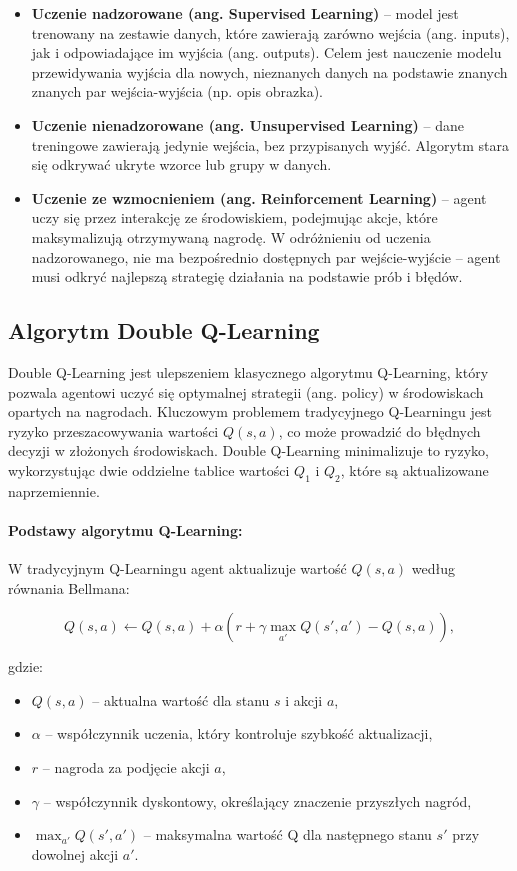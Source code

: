 \begin{itemize}
    \item \textbf{Uczenie nadzorowane (ang. Supervised Learning)} – model jest trenowany na zestawie danych, które zawierają zarówno wejścia (ang. inputs), jak i odpowiadające im wyjścia (ang. outputs). Celem jest nauczenie modelu przewidywania wyjścia dla nowych, nieznanych danych na podstawie znanych znanych par wejścia-wyjścia (np. opis obrazka).

    \item \textbf{Uczenie nienadzorowane (ang. Unsupervised Learning)} – dane treningowe zawierają jedynie wejścia, bez przypisanych wyjść. Algorytm stara się odkrywać ukryte wzorce lub grupy w danych.

    \item \textbf{Uczenie ze wzmocnieniem (ang. Reinforcement Learning)} – agent uczy się przez interakcję ze środowiskiem, podejmując akcje, które maksymalizują otrzymywaną nagrodę. W odróżnieniu od uczenia nadzorowanego, nie ma bezpośrednio dostępnych par wejście-wyjście – agent musi odkryć najlepszą strategię działania na podstawie prób i błędów.
\end{itemize}

\subsection{Algorytm Double Q-Learning}

Double Q-Learning jest ulepszeniem klasycznego algorytmu Q-Learning, który pozwala agentowi uczyć się optymalnej strategii (ang. policy) w środowiskach opartych na nagrodach. Kluczowym problemem tradycyjnego Q-Learningu jest ryzyko przeszacowywania wartości \( Q(s, a) \), co może prowadzić do błędnych decyzji w złożonych środowiskach. Double Q-Learning minimalizuje to ryzyko, wykorzystując dwie oddzielne tablice wartości \( Q_1 \) i \( Q_2 \), które są aktualizowane naprzemiennie.

\paragraph{Podstawy algorytmu Q-Learning:}
W tradycyjnym Q-Learningu agent aktualizuje wartość \( Q(s, a) \) według równania Bellmana:

\[
Q(s, a) \leftarrow Q(s, a) + \alpha \left( r + \gamma \max_{a'} Q(s', a') - Q(s, a) \right),
\]

gdzie:
\begin{itemize}
    \item \( Q(s, a) \) – aktualna wartość dla stanu \( s \) i akcji \( a \),
    \item \( \alpha \) – współczynnik uczenia, który kontroluje szybkość aktualizacji,
    \item \( r \) – nagroda za podjęcie akcji \( a \),
    \item \( \gamma \) – współczynnik dyskontowy, określający znaczenie przyszłych nagród,
    \item \( \max_{a'} Q(s', a') \) – maksymalna wartość Q dla następnego stanu \( s' \) przy dowolnej akcji \( a' \).
\end{itemize}

